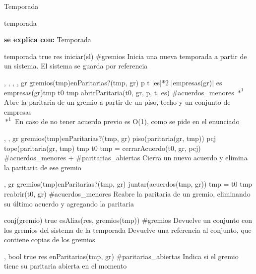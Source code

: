 \begin{interfaz}{Temporada}

\begin{iparamformales}{temporada}

\textbf{\large se explica con:} Temporada

\end{iparamformales}

{}{temporada}
{true}
{res \igobs iniciar(sl)}
{\#gremios}
{Inicia una nueva temporada a partir de un sistema.}
{El sistema se guarda por referencia}

{, , , , }{}
{gr \in gremios(tmp)\ly \neg enParitarias?(tmp, gr) \ly p \leq t \ly |es|*2 \leq |empresas(gr)| \ly es \subseteq empresas(gr)\ly tmp \igobs t0 }
{tmp \igobs abrirParitaria(t0, gr, p, t, es)  }
{\#acuerdos\_menores $*^1$}
{Abre la paritaria de un gremio a partir de un piso, techo y un conjunto de empresas \\
$*^1$ En caso de no tener acuerdo previo es O(1), como se pide en el enunciado}
{}

{,  ,  }{}
{ gr \in gremios(tmp)\lyl enParitarias?(tmp, gr) \ly piso(paritaria(gr, tmp)) \leq pcj \leq tope(paritaria(gr, tmp) \ly tmp \igobs t0 }
{tmp = cerrarAcuerdo(t0, gr, pcj)}
{\#acuerdos\_menores + \#paritarias\_abiertas}
{Cierra un nuevo acuerdo y elimina la paritaria de ese gremio}
{}

{, }{}
{gr \in gremios(tmp)\ly \neg enParitarias?(tmp, gr) \ly \emptyset \neq  juntar(acuerdos(tmp, gr)) \ly tmp = t0 }
{tmp \igobs reabrir(t0, gr) }
{\#acuerdos\_menores}
{Reabre la paritaria de un gremio, eliminando su \'ultimo acuerdo y agregando la paritaria}
{}

{}{conj(gremio)}
{true}
{ esAlias(res, gremios(tmp)) }
{\#gremios }
{Devuelve un conjunto con los gremios del sistema de la temporada}
{Devuelve una referencia al conjunto, que contiene copias de los gremios}

{, }{bool}
{true}
{ res \igobs enParitarias(tmp, gr) }
{\#paritarias\_abiertas}
{Indica si el gremio tiene su paritaria abierta en el momento}
{}


\end{interfaz}
